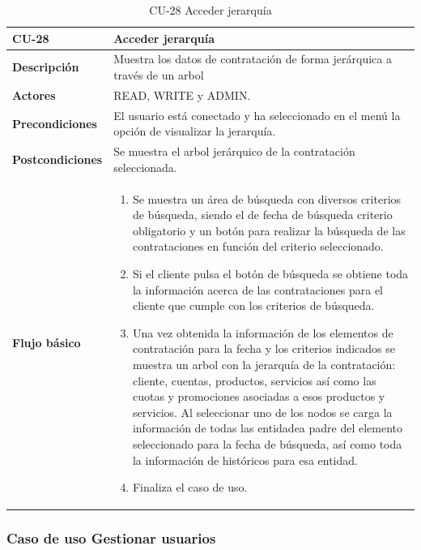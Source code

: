 \begin{table} [H]
    \centering
    \setlength{\leftmargini}{0.4cm}
	\resizebox{14cm}{!} { %
    \begin{tabular}{| m{3cm} | m{11cm} |}   
    \hline
	  \textbf{CU-28} & \textbf{Acceder jerarquía} \\\hline
	  \textbf{Descripción} & Muestra los datos de contratación de forma jerárquica a través de un arbol \\\hline
	  \textbf{Actores} & READ, WRITE y ADMIN. \\\hline
	  \textbf{Precondiciones} & El usuario está conectado y ha seleccionado en el menú la opción de visualizar la jerarquía. \\\hline
	  \textbf{Postcondiciones} & Se muestra el arbol jerárquico de la contratación seleccionada. \\\hline
	  \textbf{Flujo básico} & 
		\begin{enumerate}
	  	\item Se muestra un área de búsqueda con diversos criterios de búsqueda, siendo el de fecha de búsqueda criterio obligatorio y un botón para realizar la búsqueda de las contrataciones en función del criterio seleccionado. 
	  	\item Si el cliente pulsa el botón de búsqueda se obtiene toda la información acerca de las contrataciones para el cliente que cumple con los criterios de búsqueda. 
	  	\item Una vez obtenida la información de los elementos de contratación para la fecha y los criterios indicados se muestra un arbol con la jerarquía de la contratación: cliente, cuentas, productos, servicios así como las cuotas y promociones asociadas a esos productos y servicios. Al seleccionar uno de los nodos se carga la información de todas las entidadea padre del elemento seleccionado para la fecha de búsqueda, así como toda la información de históricos para esa entidad.
	  	\item Finaliza el caso de uso.
	  \end{enumerate} 	  	  
	  \\\hline
    \end{tabular}
    } %
    \caption{CU-28 Acceder jerarquía}
    \label{tab:cu-listar-instancia}
\end{table}



\subsubsection{Caso de uso Gestionar usuarios} 
\label{sub:cu-catalogo}


